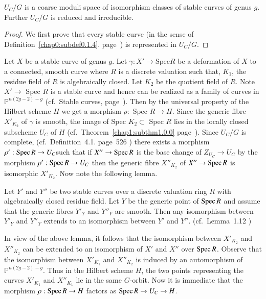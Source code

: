 \begin{subtheorem} %
$U_C/G$ is a coarse moduli space of isomorphism classes of stable
  curves of genus $g$. Further $U_C/G$ is reduced and irreducible.  
\end{subtheorem}

\begin{proof}
We first prove that every stable curve (in the sense of 
Definition~\ref{chap0:subdef0.1.4}. page~\pageref{chap0:subdef0.1.4}) 
is represented in $U_C/G$.  
\end{proof}

Let $X$ be a stable curve of genus $g$. Let $\gamma: X' \to 
\text{Spec}R$ be a deformation of $X$ to a connected, smooth curve where 
$R$ is a discrete valuation such that, $K_1$, the residue field of $R$
is algebraically closed. Let $K_2$ be the quotient field of $R$. Note
$X' \to $ Spec $R$ is a stable curve and hence can be realized as a
family of curves in $\mathbb{P}^{n (2g-2)-g}$ (cf.\ Stable curves, 
page~\pageref{c0:st_curves}). Then by the universal property of the 
Hilbert scheme $H$ we get
a morphism $\rho :$ Spec $R \to H$. Since the generic fibre $X'_{K_2}$
of $\gamma$ is smooth, the image of Spec $K_2 \subset$ Spec $ R$ lies
in the locally closed subscheme $U_C$ of $H$ (cf.\ 
Theorem~\ref{chap1:subthm1.0.0} page~\pageref{chap1:subthm1.0.0}). Since
$U_C/G$ is complete, (cf.\ Definition~4.1. page~526 \cite{key10}) 
there exists a morphism  
$\rho': \operatorname{Spec} R \to U_C$\pageoriginale such that if $X'' \to \operatorname{Spec} R$
is the base change of $Z_{U_C} \to U_C$ by the morphism $\rho': \operatorname{Spec}
R \to U_C$ then the generic fibre $X''_{K_2}$ of $X'' \to \operatorname{Spec} R$ is
isomorphic $X'_{K_2}$. Now note the following lemma.  

\setcounter{sublemma}{2}
\begin{sublemma}\label{chap2:sublem2.0.3}%
Let $Y'$ and $Y''$ be two stable curves over a discrete valuation ring
$R$ with algebraically closed residue field. Let $Y$ be the generic
point of $\operatorname{Spec} R$ and assume that the generic fibres $Y'_Y$ and
$Y''_Y$ are smooth. Then any isomorphism between $Y'_Y$ and $Y''_Y$
extends to an isomorphism between $Y'$ and $Y''$. 
(cf.\ Lemma~1.12 \cite{key1}) 
\end{sublemma}

In view of the above lemma, it follows that the isomorphism between
$X'_{K_2}$ and $X''_{K_2}$ can be extended to an isomorphism of $X'$
and $X''$ over $\operatorname{Spec} R$. Observe that the isomorphism between
$X'_{K_1}$ and $X''_{K_2}$ is induced by an automorphism of
$\mathbb{P}^{n(2g-2)-g}$. Thus in the Hilbert scheme $H$, the two
points representing the curves $X'_{K_1}$ and $X''_{K_1}$ lie in the
same $G$-orbit. Now it is immediate that the morphism $\rho: \operatorname{Spec} R
\to H$ factors as $\operatorname{Spec} R \to U_C \to H$. 

